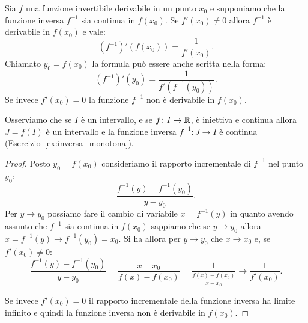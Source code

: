 \begin{theorem}
\mymark{**}
Sia $f$ una funzione invertibile derivabile in un punto $x_0$ e
supponiamo che la funzione inversa $f^{-1}$ sia continua in $f(x_0)$.
Se $f'(x_0)\neq 0$ allora $f^{-1}$ è derivabile in $f(x_0)$ e vale:
\[
  (f^{-1})'(f(x_0)) = \frac{1}{f'(x_0)}.
\]
Chiamato $y_0 = f(x_0)$ la formula può essere anche scritta nella forma:
\[
  (f^{-1})'(y_0) = \frac{1}{f'(f^{-1}(y_0))}.
\]
Se invece $f'(x_0)=0$ la funzione $f^{-1}$ non è derivabile in $f(x_0)$.
\end{theorem}
%
Osserviamo che 
se $I$ è un intervallo,
e se $f\colon I\to {\mathbb R}$,
è iniettiva e continua allora $J=f(I)$ è un intervallo
e la funzione inversa $f^{-1}\colon J\to I$
è continua (Esercizio~\ref{ex:inversa_monotona}).
%
\begin{proof}
\mymark{**}
Posto $y_0 = f(x_0)$ consideriamo il rapporto incrementale di $f^{-1}$ nel punto $y_0$:
\[
  \frac{f^{-1}(y) - f^{-1}(y_0)}{y-y_0}.
\]
Per $y\to y_0$ possiamo fare il cambio di variabile
$x=f^{-1}(y)$ in quanto avendo assunto che $f^{-1}$ sia continua in $f(x_0)$ sappiamo che se $y\to y_0$ allora $x = f^{-1}(y)\to f^{-1}(y_0) = x_0$.
Si ha allora per $y\to y_0$ che $x\to x_0$ e,
se $f'(x_0)\neq 0$:
\[
  \frac{f^{-1}(y) - f^{-1}(y_0)}{y-y_0}
  = \frac{x-x_0}{f(x)-f(x_0)}
  = \frac{1}{\frac{f(x)-f(x_0)}{x-x_0}} \to \frac{1}{f'(x_0)}.
\]

Se invece $f'(x_0)=0$ il rapporto incrementale della funzione inversa
ha limite infinito e quindi la funzione inversa non è derivabile in $f(x_0)$.
\end{proof}


